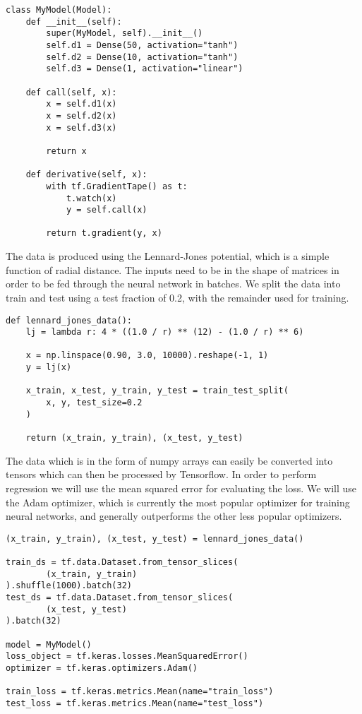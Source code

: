 \begin{verbatim}
class MyModel(Model):
    def __init__(self):
        super(MyModel, self).__init__()
        self.d1 = Dense(50, activation="tanh")
        self.d2 = Dense(10, activation="tanh")
        self.d3 = Dense(1, activation="linear")

    def call(self, x):
        x = self.d1(x)
        x = self.d2(x)
        x = self.d3(x)

        return x

    def derivative(self, x):
        with tf.GradientTape() as t:
            t.watch(x)
            y = self.call(x)

        return t.gradient(y, x)
\end{verbatim}

The data is produced using the Lennard-Jones potential,
which is a simple function of radial distance. The inputs
need to be in the shape of matrices in order
to be fed through the neural network in batches.
We split the data into train and test using a test fraction of 0.2,
with the remainder used for training.

\begin{verbatim}
def lennard_jones_data():
    lj = lambda r: 4 * ((1.0 / r) ** (12) - (1.0 / r) ** 6)

    x = np.linspace(0.90, 3.0, 10000).reshape(-1, 1)
    y = lj(x)

    x_train, x_test, y_train, y_test = train_test_split(
        x, y, test_size=0.2
    )

    return (x_train, y_train), (x_test, y_test)
\end{verbatim}

The data which is in the form of numpy arrays can easily
be converted into tensors which can then be processed
by Tensorflow. In order to perform regression
we will use the mean squared error for evaluating
the loss. We will use the Adam optimizer, which is currently
the most popular optimizer for training neural networks,
and generally outperforms the other less popular optimizers.

\begin{verbatim}
(x_train, y_train), (x_test, y_test) = lennard_jones_data()

train_ds = tf.data.Dataset.from_tensor_slices(
        (x_train, y_train)
).shuffle(1000).batch(32)
test_ds = tf.data.Dataset.from_tensor_slices(
        (x_test, y_test)
).batch(32)

model = MyModel()
loss_object = tf.keras.losses.MeanSquaredError()
optimizer = tf.keras.optimizers.Adam()

train_loss = tf.keras.metrics.Mean(name="train_loss")
test_loss = tf.keras.metrics.Mean(name="test_loss")
\end{verbatim}

